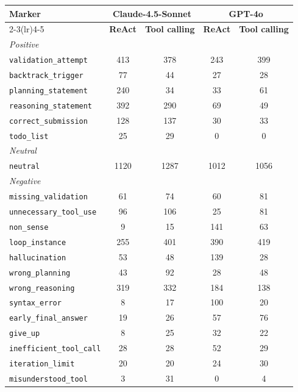 \begin{tabular}{lcccc}
\toprule
\textbf{Marker} & \multicolumn{2}{c}{\textbf{Claude-4.5-Sonnet}} & \multicolumn{2}{c}{\textbf{GPT-4o}} \\
\cmidrule(lr){2-3}\cmidrule(lr){4-5}
 & \textbf{ReAct} & \textbf{Tool calling} & \textbf{ReAct} & \textbf{Tool calling} \\
\midrule
\multicolumn{5}{l}{\textit{Positive}} \\
\midrule
\texttt{validation\_attempt} & 413 & 378 & 243 & 399 \\
\texttt{backtrack\_trigger} & 77 & 44 & 27 & 28 \\
\texttt{planning\_statement} & 240 & 34 & 33 & 61 \\
\texttt{reasoning\_statement} & 392 & 290 & 69 & 49 \\
\texttt{correct\_submission} & 128 & 137 & 30 & 33 \\
\texttt{todo\_list} & 25 & 29 & 0 & 0 \\
\midrule
\multicolumn{5}{l}{\textit{Neutral}} \\
\midrule
\texttt{neutral} & 1120 & 1287 & 1012 & 1056 \\
\midrule
\multicolumn{5}{l}{\textit{Negative}} \\
\midrule
\texttt{missing\_validation} & 61 & 74 & 60 & 81 \\
\texttt{unnecessary\_tool\_use} & 96 & 106 & 25 & 81 \\
\texttt{non\_sense} & 9 & 15 & 141 & 63 \\
\texttt{loop\_instance} & 255 & 401 & 390 & 419 \\
\texttt{hallucination} & 53 & 48 & 139 & 28 \\
\texttt{wrong\_planning} & 43 & 92 & 28 & 48 \\
\texttt{wrong\_reasoning} & 319 & 332 & 184 & 138 \\
\texttt{syntax\_error} & 8 & 17 & 100 & 20 \\
\texttt{early\_final\_answer} & 19 & 26 & 57 & 76 \\
\texttt{give\_up} & 8 & 25 & 32 & 22 \\
\texttt{inefficient\_tool\_call} & 28 & 28 & 52 & 29 \\
\texttt{iteration\_limit} & 20 & 20 & 24 & 30 \\
\texttt{misunderstood\_tool} & 3 & 31 & 0 & 4 \\
\bottomrule
\end{tabular}